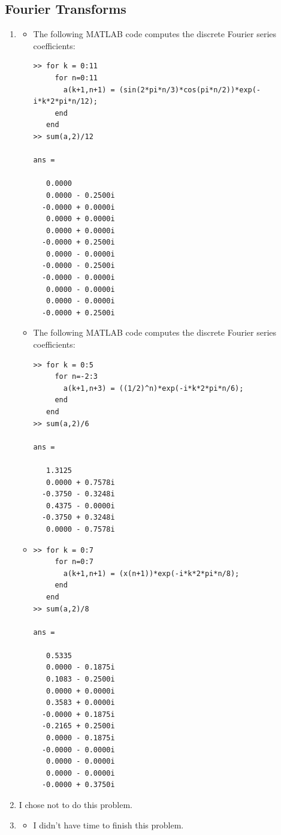 \documentclass[11pt]{article}
\begin{document}
\subsection{Fourier Transforms}
\begin{enumerate}
\item 
\begin{itemize}
\item The following MATLAB code computes the discrete Fourier series
coefficients:
\begin{verbatim}
>> for k = 0:11
     for n=0:11
       a(k+1,n+1) = (sin(2*pi*n/3)*cos(pi*n/2))*exp(-i*k*2*pi*n/12);
     end
   end
>> sum(a,2)/12

ans =

   0.0000          
   0.0000 - 0.2500i
  -0.0000 + 0.0000i
   0.0000 + 0.0000i
   0.0000 + 0.0000i
  -0.0000 + 0.2500i
   0.0000 - 0.0000i
  -0.0000 - 0.2500i
  -0.0000 - 0.0000i
   0.0000 - 0.0000i
   0.0000 - 0.0000i
  -0.0000 + 0.2500i
\end{verbatim}


\item The following MATLAB code computes the discrete Fourier series
coefficients:
\begin{verbatim}
>> for k = 0:5
     for n=-2:3
       a(k+1,n+3) = ((1/2)^n)*exp(-i*k*2*pi*n/6);
     end
   end
>> sum(a,2)/6

ans =

   1.3125          
   0.0000 + 0.7578i
  -0.3750 - 0.3248i
   0.4375 - 0.0000i
  -0.3750 + 0.3248i
   0.0000 - 0.7578i
\end{verbatim}

\newpage
\item
\begin{verbatim}
>> for k = 0:7
     for n=0:7
       a(k+1,n+1) = (x(n+1))*exp(-i*k*2*pi*n/8);                       
     end
   end
>> sum(a,2)/8 

ans =

   0.5335          
   0.0000 - 0.1875i
   0.1083 - 0.2500i
   0.0000 + 0.0000i
   0.3583 + 0.0000i
  -0.0000 + 0.1875i
  -0.2165 + 0.2500i
   0.0000 - 0.1875i
  -0.0000 - 0.0000i
   0.0000 - 0.0000i
   0.0000 - 0.0000i
  -0.0000 + 0.3750i
\end{verbatim}

\end{itemize}

\item I chose not to do this problem.

\item 
\begin{itemize}
\item I didn't have time to finish this problem.


\end{itemize}
\end{enumerate}
\end{document}
